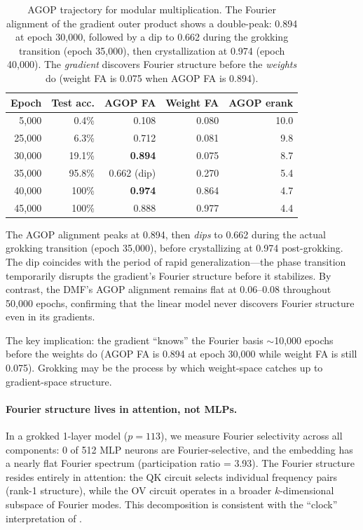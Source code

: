 \documentclass{article}
\begin{document}
\begin{table}[t]
\centering
\small
\begin{tabular}{rrrrr}
\toprule
Epoch & Test acc. & AGOP FA & Weight FA & AGOP erank \\
\midrule
5{,}000   & 0.4\%   & 0.108 & 0.080 & 10.0 \\
25{,}000  & 6.3\%   & 0.712 & 0.081 & 9.8 \\
30{,}000  & 19.1\%  & \textbf{0.894} & 0.075 & 8.7 \\
35{,}000  & 95.8\%  & 0.662 (dip) & 0.270 & 5.4 \\
40{,}000  & 100\%   & \textbf{0.974} & 0.864 & 4.7 \\
45{,}000  & 100\%   & 0.888 & 0.977 & 4.4 \\
\bottomrule
\end{tabular}
\caption{AGOP trajectory for modular multiplication. The Fourier alignment of
the gradient outer product shows a double-peak: 0.894 at epoch 30{,}000,
followed by a dip to 0.662 during the grokking transition (epoch 35{,}000),
then crystallization at 0.974 (epoch 40{,}000). The \emph{gradient}
discovers Fourier structure before the \emph{weights} do (weight FA is
0.075 when AGOP FA is 0.894).}
\label{tab:agop}
\end{table}

The AGOP alignment peaks at 0.894, then \emph{dips} to 0.662 during the
actual grokking transition (epoch 35{,}000), before crystallizing at 0.974
post-grokking. The dip coincides with the period of rapid generalization---the
phase transition temporarily disrupts the gradient's Fourier structure before
it stabilizes. By contrast, the DMF's AGOP alignment remains flat at
0.06--0.08 throughout 50{,}000 epochs, confirming that the linear model never
discovers Fourier structure even in its gradients.

The key implication: the gradient ``knows'' the Fourier basis $\sim$10{,}000
epochs before the weights do (AGOP FA is 0.894 at epoch 30{,}000 while weight
FA is still 0.075). Grokking may be the process by which weight-space catches
up to gradient-space structure.

\paragraph{Fourier structure lives in attention, not MLPs.}
In a grokked 1-layer model ($p = 113$), we measure Fourier selectivity
across all components: 0 of 512 MLP neurons are Fourier-selective, and the
embedding has a nearly flat Fourier spectrum (participation ratio = 3.93).
The Fourier structure resides entirely in attention: the QK circuit selects
individual frequency pairs (rank-1 structure), while the OV circuit operates
in a broader $k$-dimensional subspace of Fourier modes. This decomposition
is consistent with the ``clock'' interpretation of \citet{zhong2024clock}.
\end{document}
